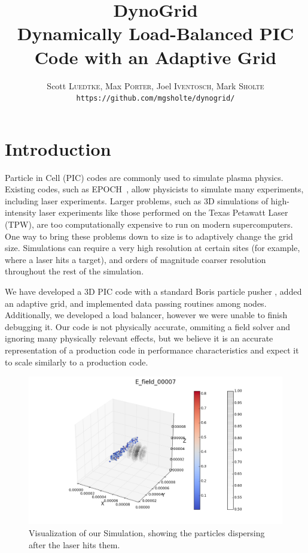 \documentclass[]{article}
\begin{document}
\title{DynoGrid\\{\Large Dynamically Load-Balanced PIC Code with an Adaptive Grid}}

\author{Scott \textsc{Luedtke}, Max \textsc{Porter}, Joel \textsc{Iventosch}, Mark \textsc{Sholte}\\\texttt{https://github.com/mgsholte/dynogrid/}}

\maketitle

\section{Introduction}

Particle in Cell (PIC) codes are commonly used to simulate plasma physics.  Existing codes, such as EPOCH~\cite{epoch}, allow physicists to simulate many experiments, including laser experiments.  Larger problems, such as 3D simulations of high-intensity laser experiments like those performed on the Texas Petawatt Laser (TPW), are too computationally expensive to run on modern supercomputers.  One way to bring these problems down to size is to adaptively change the grid size.  Simulations can require a very high resolution at certain sites (for example, where a laser hits a target), and orders of magnitude coarser resolution throughout the rest of the simulation.

We have developed a 3D PIC code with a standard Boris particle pusher \cite{bird}, added an adaptive grid, and implemented data passing routines among nodes.  Additionally, we developed a load balancer, however we were unable to finish debugging it.  Our code is not physically accurate, ommiting a field solver and ignoring many physically relevant effects, but we believe it is an accurate representation of a production code in performance characteristics and expect it to scale similarly to a production code.


\begin{figure}[h!]
    \centering
    \includegraphics[width=15cm]{viz_1.png}
    \caption{Visualization of our Simulation, showing the particles dispersing after the laser hits them.}
\end{figure}
\end{document}
